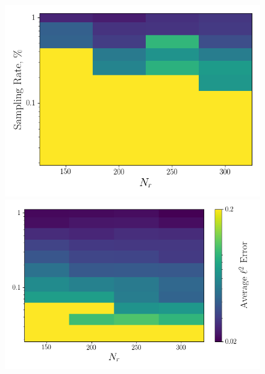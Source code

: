 \begin{figure}
	\begin{minipage}{0.46\linewidth}
		\includegraphics[width=0.99\linewidth]{Chapters/HPROMResults/Images/cvrc/deim/err_contour_random_dt5e-7.png}
	\end{minipage}
	\begin{minipage}{0.53\linewidth}
		\includegraphics[width=0.99\linewidth]{Chapters/HPROMResults/Images/cvrc/deim/err_contour_eigenvec_dt5e-7.png}
	\end{minipage}


\end{figure}
